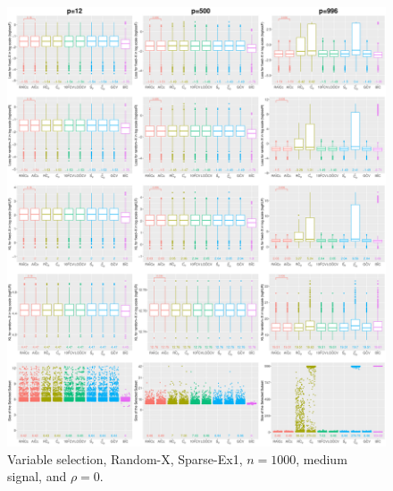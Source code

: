 \begin{figure}[!ht]
\centering
\includegraphics[width=\textwidth]{figures/supplement/randomx/subset_selection/Sparse-Ex1_n1000_msnr_rho0.eps}
\caption{Variable selection, Random-X, Sparse-Ex1, $n=1000$, medium signal, and $\rho=0$.}
\end{figure}
\clearpage
